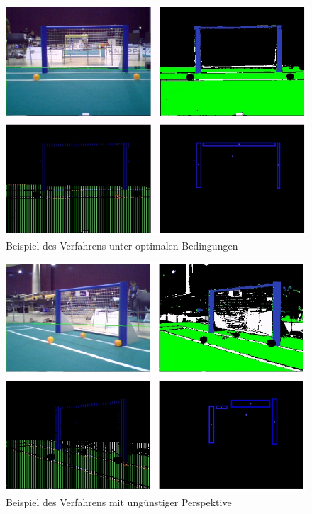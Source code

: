 \documentclass[a4paper,12pt]{article}
\begin{document}
\begin{figure}[H]
    \includegraphics[scale=0.8]{example-detection3.png}
    \caption{Beispiel des Verfahrens unter optimalen Bedingungen}
    \label{fig:example3}
\end{figure}

\begin{figure}[H]
    \includegraphics[scale=0.8]{example-detection4.png}
    \caption{Beispiel des Verfahrens mit ungünstiger Perspektive}
    \label{fig:example4}
\end{figure}
\end{document}
